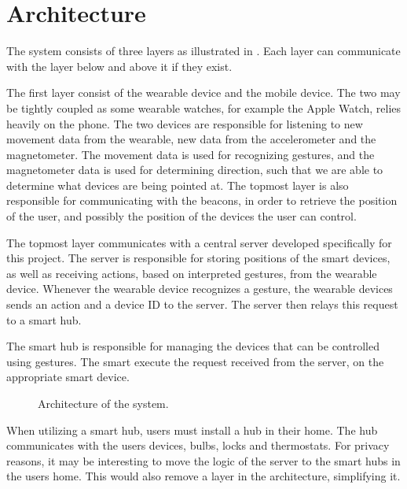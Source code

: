 \section{Architecture}\label{sec:architecture}
The system consists of three layers as illustrated in . 
Each layer can communicate with the layer below and above it if they exist.

The first layer consist of the wearable device and the mobile device. 
The two may be tightly coupled as some wearable watches, 
for example the Apple Watch, relies heavily on the phone. 
The two devices are responsible for listening to new movement data from the wearable, 
\eg new data from the accelerometer and the magnetometer.
The movement data is used for recognizing gestures, 
and the magnetometer data is used for determining direction, 
such that we are able to determine what devices are being pointed at. 
The topmost layer is also responsible for communicating with the beacons, 
in order to retrieve the position of the user, 
and possibly the position of the devices the user can control. 

The topmost layer communicates with a central server developed specifically for this project. 
The server is responsible for storing positions of the smart devices, 
as well as receiving actions, based on interpreted gestures, from the wearable device.
Whenever the wearable device recognizes a gesture, 
the wearable devices sends an action and a device ID to the server.
The server then relays this request to a smart hub. 

The smart hub is responsible for managing the devices that can be controlled using gestures. 
The smart execute the request received from the server, 
on the appropriate smart device. 

\begin{figure}[h]
  \centering
  
  \caption{Architecture of the system.}
  \label{fig:architecture}
\end{figure}

When utilizing a smart hub, users must install a hub in their home. 
The hub communicates with the users devices, \eg bulbs, locks and thermostats. 
For privacy reasons, it may be interesting to move the logic of the server to the smart hubs in the users home. 
This would also remove a layer in the architecture, simplifying it.

%

